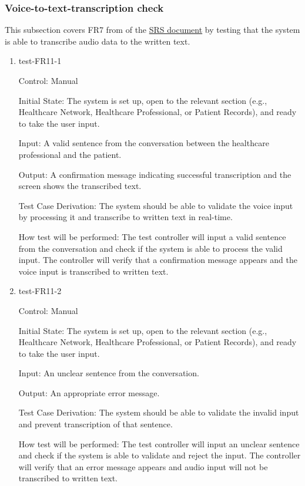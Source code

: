 \documentclass[12pt, titlepage]{article}
\begin{document}
\subsubsection{Voice-to-text-transcription check} \label{section:4.1.5}

This subsection covers FR7 from of the \href{https://github.com/Inreet-Kaur/capstone/blob/main/docs/SRS/SRS.pdf}{SRS document} \citep{SRS} by testing that the system is able to transcribe audio data to the written text.

\begin{enumerate}

\item{test-FR11-1} \label{test-FR11-1}

Control: Manual

Initial State: The system is set up, open to the relevant section (e.g., Healthcare Network, Healthcare Professional, or Patient Records), and ready to take the user input.

Input: A valid sentence from the conversation between the healthcare professional and the patient.

Output: A confirmation message indicating successful transcription and the screen shows the transcribed text.

Test Case Derivation: The system should be able to validate the voice input by processing it and transcribe to written text in real-time.

How test will be performed: The test controller will input a valid sentence from the conversation and check if the system is able to process the valid input. The controller will verify that a confirmation message appears and the voice input is transcribed to written text.


\item{test-FR11-2} \label{test-FR11-2}

Control: Manual

Initial State: The system is set up, open to the relevant section (e.g., Healthcare Network, Healthcare Professional, or Patient Records), and ready to take the user input.

Input: An unclear sentence from the conversation.

Output: An appropriate error message.

Test Case Derivation: The system should be able to validate the invalid input and prevent transcription of that sentence.

How test will be performed: The test controller will input an unclear sentence and check if the system is able to validate and reject the input. The controller will verify that an error message appears and audio input will not be transcribed to written text.

\end{enumerate}
\end{document}
